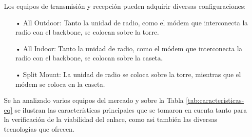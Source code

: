  
Los equipos de transmisión y recepción pueden adquirir diversas configuraciones:

\begin{enumerate}
\item[•]All Outdoor: Tanto la unidad de radio, como el módem que interconecta la radio con el backbone, se colocan sobre la torre.

\item[•]All Indoor: Tanto la unidad de radio, como el módem que interconecta la radio con el backbone, se colocan sobre la caseta.

\item[•]Split Mount: La unidad de radio se coloca sobre la torre, mientras que el módem se coloca en la caseta.
\end{enumerate}


Se ha analizado varios equipos del mercado y sobre la Tabla \ref{tab:caracteristicas-eq} se ilustran las características principales que se tomaron en cuenta tanto para la verificación de la viabilidad del enlace, como asi también las diversas tecnologías que ofrecen.


